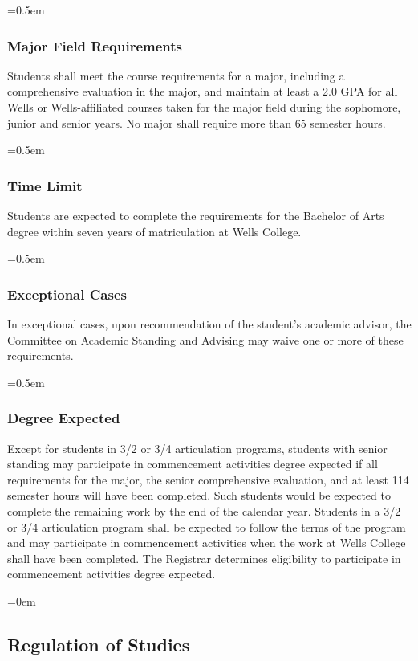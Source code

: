 \documentclass{manual}
\let\oldsubsection\subsection
\renewcommand\subsection{\leftskip=0em\oldsubsection}
\let\oldsubsubsection\subsubsection
\renewcommand\subsubsection{\leftskip=0.5em\oldsubsubsection}
\begin{document}
		\subsubsection{Major Field Requirements}

			Students  shall meet the course requirements for a major, including a comprehensive evaluation in the major, and maintain at least a 2.0 GPA for all Wells or Wells-affiliated courses taken for the major field during the sophomore, junior and senior years. No major shall require more than 65 semester hours.

		\subsubsection{Time Limit}

			Students are expected to complete the requirements for the Bachelor of Arts degree within seven years of matriculation at Wells College. 

		\subsubsection{Exceptional Cases}

			In exceptional cases, upon recommendation of the student's academic advisor, the Committee on Academic Standing and Advising may waive one or more of these requirements.

		\subsubsection{Degree Expected}

			Except  for students in 3/2 or 3/4 articulation programs, students with senior standing may participate in commencement activities degree expected if all requirements for the major, the senior comprehensive evaluation, and at least 114 semester hours will have been completed. Such students would be expected to complete the remaining work by the end of the calendar year. Students in a 3/2 or 3/4 articulation program shall be expected to follow the terms of the program and may participate in commencement activities when the work at Wells College shall have been completed. The Registrar determines eligibility to participate in commencement activities degree expected.

	\subsection{Regulation of Studies}\label{sec:RegulationOfStudies}
\end{document}
